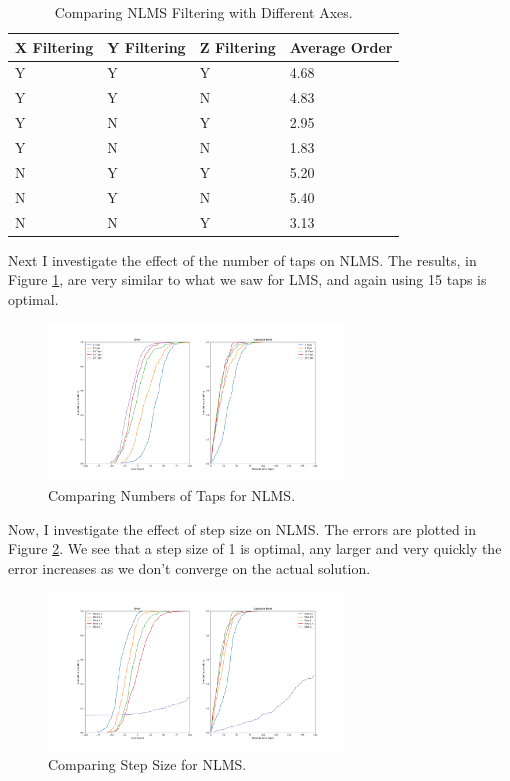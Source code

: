 \documentclass[12pt,a4paper,twoside,openright]{report}
\begin{document}
\begin{table}[]
\centering
\caption{Comparing NLMS Filtering with Different Axes.}
\label{table:nlms-errors}
\begin{tabular}{|l|l|l|l|}
\hline
X Filtering & Y Filtering & Z Filtering & Average Order \\ \hline
Y           & Y           & Y           & 4.68          \\
Y           & Y           & N           & 4.83          \\
Y           & N           & Y           & 2.95          \\
Y           & N           & N           & 1.83          \\
N           & Y           & Y           & 5.20          \\
N           & Y           & N           & 5.40          \\
N           & N           & Y           & 3.13          \\
\hline
\end{tabular}
\end{table}

Next I investigate the effect of the number of taps on NLMS. The results, in
Figure \ref{fig:nlms-medium-taps}, are very similar to what we saw for LMS, and
again using 15 taps is optimal.

\begin{figure}[tbh]
	\centerline{\includegraphics[width=0.7\textwidth]{figs/nlms-taps-error-medium-noise.png}}
	\caption{Comparing Numbers of Taps for NLMS.}
	\label{fig:nlms-medium-taps}
\end{figure}

Now, I investigate the effect of step size on NLMS. The errors are plotted in
Figure \ref{fig:nlms-medium-step}. We see that a step size of 1 is optimal,
any larger and very quickly the error increases as we don't converge on the
actual solution.

\begin{figure}[tbh]
	\centerline{\includegraphics[width=0.7\textwidth]{figs/nlms-steps-error-medium-noise.png}}
	\caption{Comparing Step Size for NLMS.}
	\label{fig:nlms-medium-step}
\end{figure}
\end{document}
